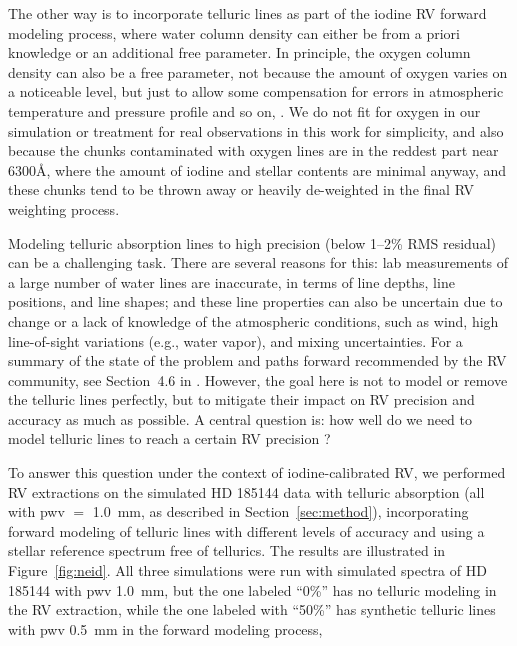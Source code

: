 The other way is to incorporate telluric lines as part of the iodine
RV forward modeling process, where water column density can either be
from a priori knowledge or an additional free parameter. In principle,
the oxygen column density can also be a free parameter, not because
the amount of oxygen varies on a noticeable level, but just to allow
some compensation for errors in atmospheric temperature and pressure
profile and so on, . We do not fit for oxygen in our simulation or treatment
for real observations in this work for simplicity, and also because
the chunks contaminated with oxygen lines are in the reddest part near
6300\AA, where the amount of iodine and stellar contents are minimal
anyway, and these chunks tend to be thrown away or heavily de-weighted
in the final RV weighting process.

Modeling telluric absorption lines to high precision (below 1--2\% RMS
residual) can be a challenging task. There are several reasons for
this: lab measurements of a large number of water lines are
inaccurate, in terms of line depths, line positions, and line shapes;
and these line properties can also be uncertain due to change or a
lack of knowledge of the atmospheric conditions, such as wind, high
line-of-sight variations (e.g., water vapor), and mixing
uncertainties. For a summary of the state of the problem and paths
forward recommended by the RV community, see Section~4.6 in
\cite{eprv2015}. However, the goal here is not to model or remove
the telluric lines perfectly, but to mitigate their impact on RV
precision and accuracy as much as possible. A central question is: how
well do we need to model telluric lines to reach a certain RV
precision \citep{eprv2015}?

To answer this question under the context of iodine-calibrated RV, we
performed RV extractions on the simulated HD 185144 data with telluric
absorption (all with pwv $=$ 1.0~mm, as described in
Section~\ref{sec:method}), incorporating forward modeling of
telluric lines with different levels of accuracy and using a stellar
reference spectrum free of tellurics. The results are illustrated in
Figure~\ref{fig:neid}. All three simulations were run with
simulated spectra of HD 185144 with pwv 1.0~mm, but the one labeled
``0\%'' has no telluric modeling in the RV extraction, while the one
labeled with ``50\%'' has synthetic telluric lines with pwv 0.5~mm in
the forward modeling process, 

